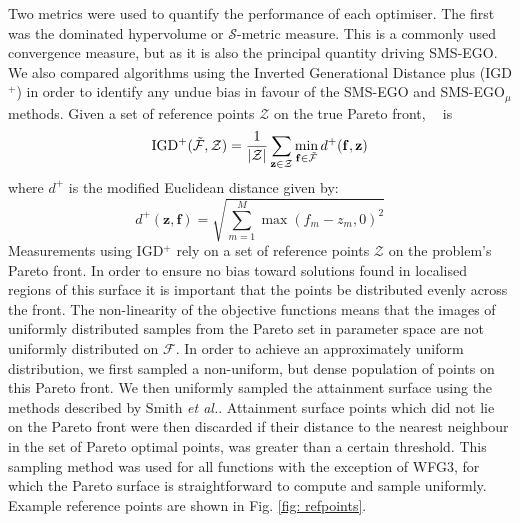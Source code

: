\documentclass[conference]{IEEEtran}
\makeatletter
\DeclarePairedDelimiter\abs{\lvert}{\rvert}%
\newcommand{\nobj}{M}
\DeclareMathOperator*{\igdp}{IGD^{+}}
\newcommand\hpv{dominated hypervolume\xspace}
\newcommand\smsego{SMS-EGO\xspace}
\newcommand\smsegomu{SMS-EGO$_{\mu}$\xspace}
\newcommand\igd{IGD$^+$\xspace}
\newcommand\mF{\mathcal{F}}
\newcommand\Fapprox{\tilde{\mathcal{F}}}
\newcommand{\pigdref}{\mathcal{Z}}
\newcommand{\bff}{\mathbf{f}}
\newcommand*{\etal}{\textit{et al.}\@\xspace}
\makeatother
\begin{document}
Two metrics were used to quantify the performance of each optimiser. The first was the \hpv or $\mathcal{S}$-metric measure. This is a commonly used convergence measure, but as it is also the principal quantity driving \smsego. We also compared algorithms using the   Inverted Generational Distance plus (\igd) \cite{ishibuchi2015modified} in order to identify any undue bias in favour of the \smsego and \smsegomu methods. Given a set of reference points $\pigdref$ on the true Pareto front, $\igdp$ is
\begin{equation}
    \igdp(\Fapprox, \pigdref) = \frac{1}{\abs{\pigdref}}
    \sum_{\mathbf{z}\in\pigdref} \min_{\bff \in \Fapprox} d^{+}(\bff, \mathbf{z})
\end{equation}
where $d^{+}$ is the modified Euclidean distance given by:
\begin{equation}
    d^+(\mathbf{z}, \mathbf{f}) = \sqrt{\sum^{\nobj}_{m=1}\max(f_m - z_m, 0)^2}
\end{equation}
Measurements using \igd rely on a set of reference points $\pigdref$ on the problem's Pareto front. In order to ensure no bias toward solutions found in localised regions of this surface it is important that the points be distributed evenly across the front. The non-linearity of the objective functions means that the images of  uniformly distributed samples from the Pareto set in parameter space are not uniformly distributed on $\mF$.  In order to achieve an approximately uniform distribution, we first sampled a non-uniform, but dense population of points on this Pareto front.  We then uniformly sampled the attainment surface  using the methods described by Smith \etal \cite{smith2004dominance}. Attainment surface points which did not lie on the Pareto front were then discarded if their distance to the nearest neighbour in the set of Pareto optimal points, was greater than a certain threshold. This sampling method was used for all functions with the exception of WFG3, for which the Pareto surface is straightforward to compute and sample uniformly. Example reference points are shown in Fig. \ref{fig: refpoints}.  
\end{document}

